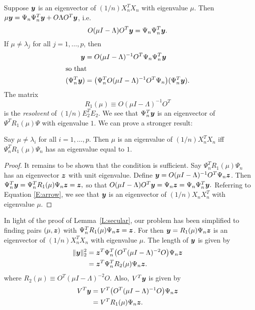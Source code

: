 Suppose $\boldsymbol{y}$ is an eigenvector of $(1/n) X_n^T X_n$ with eigenvalue $\mu$.  Then $\mu \boldsymbol{y} = \Psi_n \Psi_n^T \boldsymbol{y} + O \Lambda O^T \boldsymbol{y}$, i.e.
\[
    O (\mu I - \Lambda) O^T \boldsymbol{y} = \Psi_n \Psi_n^T \boldsymbol{y}.
\]
If $\mu \neq \lambda_j$ for all $j = 1, \ldots, p$, then
\begin{align*}
    \boldsymbol{y} &= O (\mu I - \Lambda)^{-1} O^T \Psi_n \Psi_n^T \boldsymbol{y} \\
    \intertext{so that}
    (\Psi_n^T \boldsymbol{y}) &= \big(\Psi_n^T O (\mu I - \Lambda)^{-1} O^T \Psi_n \big) (\Psi_n^T \boldsymbol{y}).
\end{align*}
The matrix 
\begin{equation}
    R_1(\mu)
    \equiv
    O (\mu I - \Lambda)^{-1} O^T
\end{equation}
is the \emph{resolvent} of $(1/n) E_2^T E_2$.  We see that
$\Psi_n^T \boldsymbol{y}$ is an eigenvector of $\Psi^T R_1 (\mu) \Psi$
with eigenvalue $1$.  We can prove a stronger result:

\begin{lemma}\label{L:secular}
    Say $\mu \neq \lambda_i$ for all $i = 1, \ldots, p$.  Then $\mu$ is an
    eigenvalue of $(1/n) X_n^T X_n$ iff
    $\Psi_n^T R_1 (\mu) \Psi_n$ has an eigenvalue equal to $1$.
\end{lemma}
\begin{proof}
    It remains to be shown that the condition is sufficient.  Say 
    $\Psi_n^T R_1 (\mu) \Psi_n$ has an eigenvector $\boldsymbol{z}$ with unit eigenvalue. 
    Define
    $\boldsymbol{y} = O (\mu I - \Lambda)^{-1} O^T \Psi_n \boldsymbol{z}$.  Then 
    \(
        \Psi_n^T \boldsymbol{y} = \Psi_n^T R_1 (\mu) \Psi_n \boldsymbol{z} = \boldsymbol{z},
    \)
    so that
    \(
        O (\mu I - \Lambda) O^T \boldsymbol{y} 
        =
        \Psi_n \boldsymbol{z}
        =
        \Psi_n \Psi_n^T \boldsymbol{y}.
    \)
    Referring to Equation \eqref{E:arrow}, we see that
    $\boldsymbol{y}$ is an eigenvector of $(1/n) X_n X_n^T$ with
    eigenvalue $\mu$.
\end{proof}

In light of the proof of Lemma~\ref{L:secular}, our problem has been 
simplified to finding pairs $(\mu, \boldsymbol{z})$ with
$\Psi_n^T R_1 (\mu) \Psi_n \boldsymbol{z} = \boldsymbol{z}$.  For then
$\boldsymbol{y} = R_1(\mu) \Psi_n \boldsymbol{z}$ is an eigenvector of
$(1/n) X_n^T X_n$ with eigenvalue $\mu$.  The length
of $\boldsymbol{y}$ is given by
\begin{align}
    \| \boldsymbol{y} \|_2^2 
        &= \boldsymbol{z}^T \Psi_n^T \big( O^T (\mu I - \Lambda)^{-2} O \big) \Psi_n \boldsymbol{z} 
            \notag \\
        &= \boldsymbol{z}^T \Psi_n^T R_2(\mu) \Psi_n \boldsymbol{z}.
            \label{E:normY}
\end{align}
where $R_2(\mu) \equiv O^T (\mu I - \Lambda)^{-2} O$.  Also, $V^T \boldsymbol{y}$ is 
given by
\begin{align}
    V^T \boldsymbol{y} 
        &= V^T \big( O^T (\mu I - \Lambda)^{-1} O \big) \Psi_n \boldsymbol{z} \notag \\
        &= V^T R_1(\mu) \Psi_n \boldsymbol{z}.  \label{E:corrY}
\end{align}

